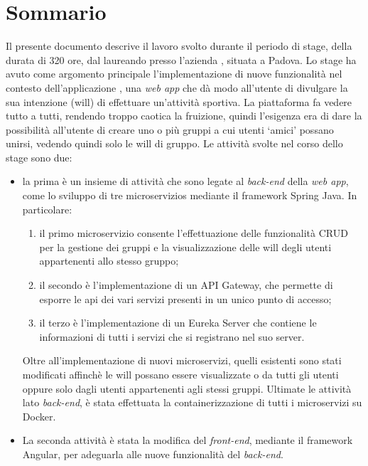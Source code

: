 
\cleardoublepage
{}
{}
\begingroup
\let\clearpage\relax
\let\cleardoublepage\relax
\let\cleardoublepage\relax

\chapter*{Sommario}

Il presente documento descrive il lavoro svolto durante il periodo di stage, della durata di 320 ore, dal laureando \myName\xspace presso
 l'azienda \myCompany, situata a Padova.
Lo stage ha avuto come argomento principale l'implementazione di nuove funzionalità nel contesto dell'applicazione \productName, una
\textit{web app} che dà modo all'utente di divulgare la sua intenzione (\gls{will}) di effettuare un'attività sportiva.
La piattaforma fa vedere tutto a tutti, rendendo troppo caotica la fruizione, quindi l'esigenza era di dare la possibilità all'utente 
di creare uno o più gruppi a cui utenti \enquote*{amici} possano unirsi, vedendo quindi solo le \gls{will} di gruppo.
Le attività svolte nel corso dello stage sono due:
\begin{itemize}
    \item la prima è un insieme di attività che sono legate al \textit{back-end} della \textit{web app}, come lo sviluppo di tre \glspl{microservizio} mediante il \gls{framework} \gls{Spring} Java. 
    In particolare: 
        \begin{enumerate}
            \item il primo microservizio consente l'effettuazione delle funzionalità \gls{CRUD} per la gestione dei gruppi e la visualizzazione delle \gls{will} 
            degli utenti appartenenti allo stesso gruppo;
            \item il secondo è l'implementazione di un \gls{API Gateway}, che permette di esporre le \gls{api} dei vari servizi presenti in un 
            unico punto di accesso;
            \item il terzo è l'implementazione di un \gls{Eureka Server} che contiene le informazioni di tutti i servizi che si registrano nel suo server.
        \end{enumerate}
    Oltre all'implementazione di nuovi microservizi, quelli esistenti sono stati modificati affinchè le \gls{will} possano
    essere visualizzate o da tutti gli utenti oppure solo dagli utenti appartenenti agli stessi gruppi. 
    Ultimate le attività lato \textit{back-end}, è stata effettuata la \gls{containerizzazione} di tutti i microservizi su Docker.
    \item La seconda attività è stata la modifica del \textit{front-end}, mediante il framework \gls{Angular}, per adeguarla alle nuove funzionalità del \textit{back-end}.
\end{itemize}
